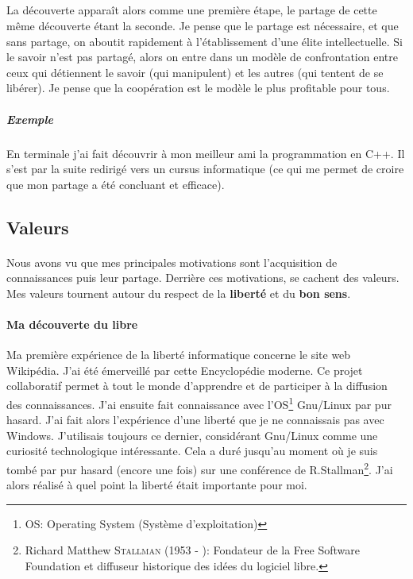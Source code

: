 \documentclass[a4paper,12pt, draft]{report}
\begin{document}
\subparagraph{}
La découverte apparaît alors comme une première étape, le partage de cette même découverte étant la seconde. Je pense que le partage est nécessaire, et que sans partage, on aboutit rapidement  à l'établissement d'une élite intellectuelle. Si le savoir n'est pas partagé, alors on entre dans un modèle de confrontation entre ceux qui détiennent le savoir (qui manipulent) et les autres (qui tentent de se libérer). Je pense que la coopération est le modèle le plus profitable pour tous.

\subparagraph{Exemple} En terminale j'ai fait découvrir à mon meilleur ami la programmation en C++. Il s'est par la suite redirigé vers un cursus informatique (ce qui me permet de croire que mon partage a été concluant et efficace).




\subsection{Valeurs}
\paragraph{}
Nous avons vu que mes principales motivations sont l'acquisition de\\ connaissances puis leur partage. Derrière ces motivations, se cachent des valeurs.
Mes valeurs tournent autour du respect de la \textbf{liberté} et du \textbf{bon sens}.

\paragraph{Ma découverte du libre}

Ma première expérience de la liberté informatique concerne le site web Wikipédia. J'ai été émerveillé par cette Encyclopédie moderne.
Ce projet collaboratif permet à tout le monde d'apprendre et de participer à la diffusion des connaissances.
J'ai ensuite fait connaissance avec l'OS\footnote{\textsc{OS}: Operating System (Système d'exploitation)} Gnu/Linux par pur hasard. J'ai fait alors l'expérience d'une liberté que je ne connaissais pas avec Windows. J'utilisais toujours ce dernier, considérant Gnu/Linux comme une curiosité technologique intéressante. 
Cela a duré jusqu'au moment où je suis tombé par pur hasard (encore une fois) sur une conférence de R.Stallman\footnote{Richard Matthew \textsc{Stallman} (1953 - ): Fondateur de la Free Software Foundation et diffuseur historique des idées du logiciel libre.}. J'ai alors réalisé à quel point la liberté était importante pour moi.
\end{document}
